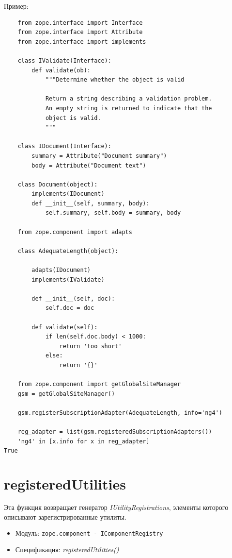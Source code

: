 \documentclass[a4paper,openany,twoside,final]{book}
\providecommand*{\DUroletitlereference}[1]{\textsl{#1}}
\begin{document}
Пример:

\begin{verbatim}
    from zope.interface import Interface
    from zope.interface import Attribute
    from zope.interface import implements

    class IValidate(Interface):
        def validate(ob):
            """Determine whether the object is valid

            Return a string describing a validation problem.
            An empty string is returned to indicate that the
            object is valid.
            """

    class IDocument(Interface):
        summary = Attribute("Document summary")
        body = Attribute("Document text")

    class Document(object):
        implements(IDocument)
        def __init__(self, summary, body):
            self.summary, self.body = summary, body

    from zope.component import adapts

    class AdequateLength(object):

        adapts(IDocument)
        implements(IValidate)

        def __init__(self, doc):
            self.doc = doc

        def validate(self):
            if len(self.doc.body) < 1000:
                return 'too short'
            else:
                return '{}'

    from zope.component import getGlobalSiteManager
    gsm = getGlobalSiteManager()

    gsm.registerSubscriptionAdapter(AdequateLength, info='ng4')

    reg_adapter = list(gsm.registeredSubscriptionAdapters())
    'ng4' in [x.info for x in reg_adapter]
True
\end{verbatim}


\section*{registeredUtilities%
  \label{registeredutilities}%
}

Эта функция возвращает генератор \DUroletitlereference{IUtilityRegistrations}, элементы которого описывают зарегистрированные утилиты.

\begin{itemize}

\item Модуль: \texttt{zope.component - IComponentRegistry}

\item Спецификация: \DUroletitlereference{registeredUtilities()}

\end{itemize}
\end{document}
